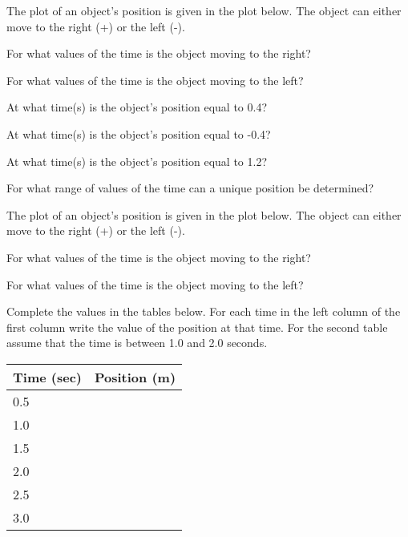 \begin{problem}
  \item The plot of an object's position is given in the plot
    below. The object can either move to the right (+) or the left
    (-).

    \scalebox{0.4}{}

    \begin{subproblem}
    \item For what values of the time is the object moving to the
      right?
      \vfill
    \item For what values of the time is the object moving to the
      left?
      \vfill
    \item At what time(s) is the object's position equal to 0.4?
      \vfill
    \item At what time(s) is the object's position equal to -0.4?
      \vfill
    \item At what time(s) is the object's position equal to 1.2?
      \vfill
    \item For what range of values of the time can a unique position
      be determined?
      \vfill
    \end{subproblem}

    \clearpage

  \item The plot of an object's position is given in the plot
    below. The object can either move to the right (+) or the left
    (-).

    \scalebox{0.4}{}

\begin{subproblem}
  \item For what values of the time is the object moving to the
    right?
    \vfill
  \item For what values of the time is the object moving to the
    left?
    \vfill
  \item     Complete the values in the tables below. For each time in the left
      column of the first column write the value of the position at that
      time. For the second table assume that the time is between 1.0 and
      2.0 seconds.

      \begin{tabular}{l|l}
        Time (sec) & Position (m) \\ \hline
        0.5 & \\ [12pt]
        1.0 & \\  [12pt]
        1.5 & \\  [12pt]
        2.0 & \\  [12pt]
        2.5 & \\  [12pt]
        3.0
      \end{tabular}


\end{subproblem}
\end{problem}

